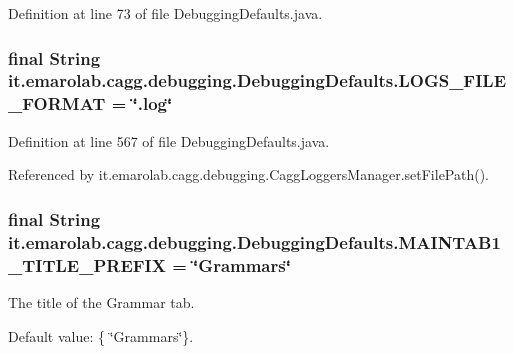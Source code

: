 Definition at line 73 of file Debugging\-Defaults.\-java.

\hypertarget{classit_1_1emarolab_1_1cagg_1_1debugging_1_1DebuggingDefaults_ae767f9af1e7b670473d85ab357062d1a}{
\subsubsection[{L\-O\-G\-S\-\_\-\-F\-I\-L\-E\-\_\-\-F\-O\-R\-M\-A\-T}]{\setlength{\rightskip}{0pt plus 5cm}final String it.\-emarolab.\-cagg.\-debugging.\-Debugging\-Defaults.\-L\-O\-G\-S\-\_\-\-F\-I\-L\-E\-\_\-\-F\-O\-R\-M\-A\-T = \char`\"{}.log\char`\"{}\hspace{0.3cm}{\ttfamily [static]}}}\label{classit_1_1emarolab_1_1cagg_1_1debugging_1_1DebuggingDefaults_ae767f9af1e7b670473d85ab357062d1a}


Definition at line 567 of file Debugging\-Defaults.\-java.



Referenced by it.\-emarolab.\-cagg.\-debugging.\-Cagg\-Loggers\-Manager.\-set\-File\-Path().

\hypertarget{classit_1_1emarolab_1_1cagg_1_1debugging_1_1DebuggingDefaults_a97f5e1d3d67c6d09e905b02dfbfd7372}{
\subsubsection[{M\-A\-I\-N\-T\-A\-B1\-\_\-\-T\-I\-T\-L\-E\-\_\-\-P\-R\-E\-F\-I\-X}]{\setlength{\rightskip}{0pt plus 5cm}final String it.\-emarolab.\-cagg.\-debugging.\-Debugging\-Defaults.\-M\-A\-I\-N\-T\-A\-B1\-\_\-\-T\-I\-T\-L\-E\-\_\-\-P\-R\-E\-F\-I\-X = \char`\"{}Grammars\char`\"{}\hspace{0.3cm}{\ttfamily [static]}}}\label{classit_1_1emarolab_1_1cagg_1_1debugging_1_1DebuggingDefaults_a97f5e1d3d67c6d09e905b02dfbfd7372}
The title of the Grammar tab.\par
 Default value\-: \{ \char`\"{}\-Grammars\char`\"{}\}. 

